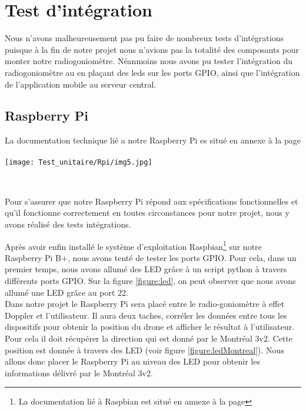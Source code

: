 
\chapter{Test d'intégration}

Nous n'avons malheureusement pas pu faire de nombreux tests d'intégrations puisque à la fin de notre projet nous n'avions pas la totalité des composants pour monter notre radiogoniomètre. Néanmoins nous avons pu tester l'intégration du radiogoniomètre au \rpi en plaçant des leds sur les ports GPIO, ainsi que l'intégration de l'application mobile au serveur central.


\section{Raspberry Pi}
La documentation technique lié a notre Raspberry Pi es situé en annexe à la page \pageref{annexe:rpi}
~\\

\texttt{[image: Test\_unitaire/Rpi/img5.jpg]}

~\\
\parindent=15pt

Pour s'assurer que notre Raspberry Pi répond aux spécifications fonctionnelles et qu'il fonctionne correctement en toutes circonstances pour notre projet, nous y avons réalisé des tests intégrations.

Après avoir enfin installé le système d'exploitation Raspbian\footnote{La documentation lié à Raspbian est situé en annexe à la page \pageref{annexe:raspbian}} sur notre Raspberry Pi B+, nous avons tenté de tester les ports GPIO. Pour cela, dans un premier temps, nous avons allumé des LED grâce à un script python à travers différents ports GPIO. Sur la figure \ref{figure:led}, on peut observer que nous avons allumé une LED grâce au port 22.
~\\

Dans notre projet le Raspberry Pi sera placé entre le radio-goniomètre à effet Doppler et l'utilisateur. Il aura deux taches, corréler les données entre tous les dispositifs pour obtenir la position du drone et afficher le résultat à l'utilisateur. Pour cela il doit récupérer la direction qui est donné par le Montréal 3v2. Cette position est donnée à travers des LED (voir figure \ref{figure:ledMontreal}). Nous allons donc placer le Raspberry Pi au niveau des LED pour obtenir les informations délivré par le Montréal 3v2. %

